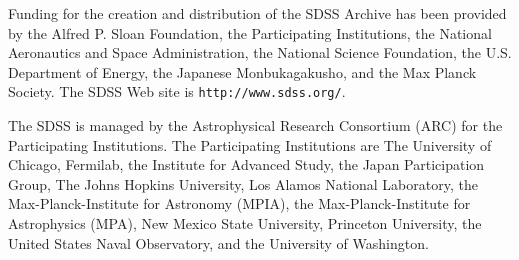 \documentclass[10pt,preprint]{aastex}
\begin{document}
\acknowledgments

Funding for the creation and distribution of the SDSS Archive has been
provided by the Alfred P. Sloan Foundation, the Participating
Institutions, the National Aeronautics and Space Administration, the
National Science Foundation, the U.S. Department of Energy, the
Japanese Monbukagakusho, and the Max Planck Society. The SDSS Web site
is {\tt http://www.sdss.org/}.

The SDSS is managed by the Astrophysical Research Consortium (ARC) for
the Participating Institutions. The Participating Institutions are The
University of Chicago, Fermilab, the Institute for Advanced Study, the
Japan Participation Group, The Johns Hopkins University, Los Alamos
National Laboratory, the Max-Planck-Institute for Astronomy (MPIA),
the Max-Planck-Institute for Astrophysics (MPA), New Mexico State
University, Princeton University, the United States Naval Observatory,
and the University of Washington.
 
\begin{thebibliography}{DUM}

\end{thebibliography}

\newpage

%


\end{document}
